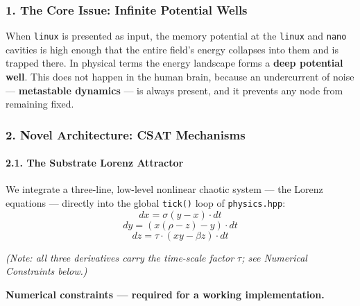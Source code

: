 \documentclass[
  11pt,
  a4paper,
]{article}
\begin{document}
\subsubsection{1. The Core Issue: Infinite Potential
Wells}\label{the-core-issue-infinite-potential-wells}

When \texttt{linux} is presented as input, the memory potential at the
\texttt{linux} and \texttt{nano} cavities is high enough that the entire
field's energy collapses into them and is trapped there. In physical
terms the energy landscape forms a \textbf{deep potential well}. This
does not happen in the human brain, because an undercurrent of noise ---
\textbf{metastable dynamics} --- is always present, and it prevents any
node from remaining fixed.

\subsubsection{2. Novel Architecture: CSAT
Mechanisms}\label{novel-architecture-csat-mechanisms}

\paragraph{2.1. The Substrate Lorenz
Attractor}\label{the-substrate-lorenz-attractor}

We integrate a three-line, low-level nonlinear chaotic system --- the
Lorenz equations --- directly into the global \texttt{tick()} loop of
\texttt{physics.hpp}: \[ dx = \sigma(y - x) \cdot dt \]
\[ dy = (x(\rho - z) - y) \cdot dt \]
\[ dz = \tau \cdot (xy - \beta z) \cdot dt \]

\emph{(Note: all three derivatives carry the time-scale factor \(\tau\);
see Numerical Constraints below.)}

\textbf{Numerical constraints --- required for a working
implementation.}
\end{document}
